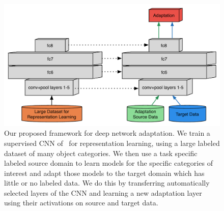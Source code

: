 \newcommand{\svmT}{\bm{\theta}}
\newcommand{\svmB}{b}
\newcommand{\svmAug}{\tilde{\svmT}}
\newcommand{\svmAugAll}{\bm{\Theta}}


\begin{figure}
\begin{center}
\includegraphics[width=.6\linewidth]{figs/model-adapt}
\end{center}
\caption{Our proposed framework for deep network adaptation. We train a supervised CNN of~\cite{supervision} for representation learning, using a large labeled dataset of many object categories. We then use a task specific labeled source domain to learn models for the specific categories of interest and adapt those models to the target domain which has little or no labeled data.  We do this by transferring automatically selected layers of the CNN and learning a new adaptation layer using their activations on source and target data.}
\label{fig:model-adapt}
\end{figure}

